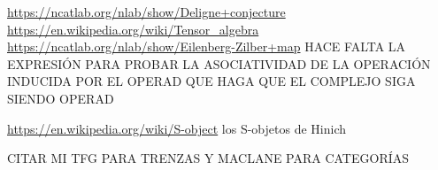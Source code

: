 \documentclass[TFM.tex]{subfiles}
\begin{document}


\url{https://ncatlab.org/nlab/show/Deligne+conjecture}
\url{https://en.wikipedia.org/wiki/Tensor_algebra}
\url{https://ncatlab.org/nlab/show/Eilenberg-Zilber+map} HACE FALTA LA EXPRESIÓN PARA PROBAR LA ASOCIATIVIDAD DE LA OPERACIÓN INDUCIDA POR EL OPERAD QUE HAGA QUE EL COMPLEJO SIGA SIENDO OPERAD

\url{https://en.wikipedia.org/wiki/S-object} los S-objetos de Hinich

CITAR MI TFG PARA TRENZAS Y MACLANE PARA CATEGORÍAS
\end{document}
